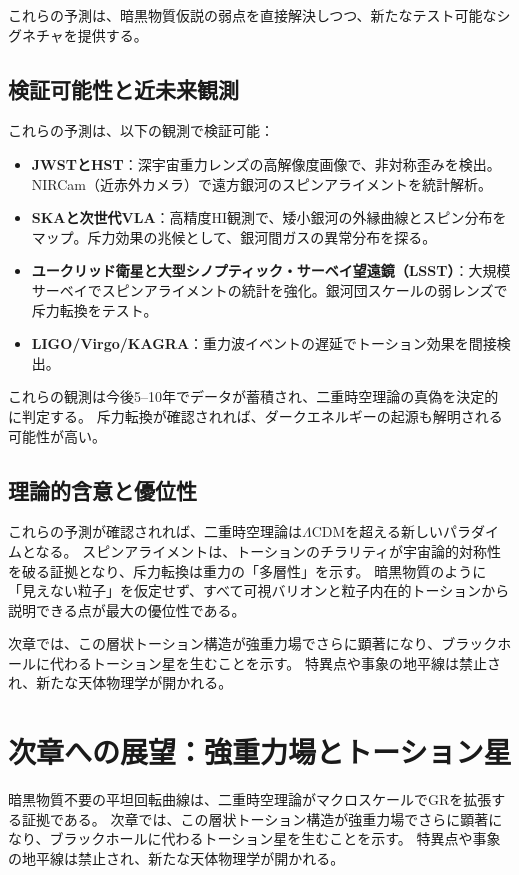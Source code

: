\documentclass[dvipdfmx,a4paper]{jsbook}
\theoremstyle{definition}
\theoremstyle{remark}
\begin{document}
これらの予測は、暗黒物質仮説の弱点を直接解決しつつ、新たなテスト可能なシグネチャを提供する。

\subsection{検証可能性と近未来観測}

これらの予測は、以下の観測で検証可能：
\begin{itemize}
  \item \textbf{JWSTとHST}：深宇宙重力レンズの高解像度画像で、非対称歪みを検出。NIRCam（近赤外カメラ）で遠方銀河のスピンアライメントを統計解析。
  \item \textbf{SKAと次世代VLA}：高精度HI観測で、矮小銀河の外縁曲線とスピン分布をマップ。斥力効果の兆候として、銀河間ガスの異常分布を探る。
  \item \textbf{ユークリッド衛星と大型シノプティック・サーベイ望遠鏡（LSST）}：大規模サーベイでスピンアライメントの統計を強化。銀河団スケールの弱レンズで斥力転換をテスト。
  \item \textbf{LIGO/Virgo/KAGRA}：重力波イベントの遅延でトーション効果を間接検出。
\end{itemize}

これらの観測は今後5--10年でデータが蓄積され、二重時空理論の真偽を決定的に判定する。  
斥力転換が確認されれば、ダークエネルギーの起源も解明される可能性が高い。

\subsection{理論的含意と優位性}

これらの予測が確認されれば、二重時空理論は$\Lambda$CDMを超える新しいパラダイムとなる。  
スピンアライメントは、トーションのチラリティが宇宙論的対称性を破る証拠となり、斥力転換は重力の「多層性」を示す。  
暗黒物質のように「見えない粒子」を仮定せず、すべて可視バリオンと粒子内在的トーションから説明できる点が最大の優位性である。

次章では、この層状トーション構造が強重力場でさらに顕著になり、ブラックホールに代わるトーション星を生むことを示す。  
特異点や事象の地平線は禁止され、新たな天体物理学が開かれる。

\section{次章への展望：強重力場とトーション星}
\label{sec:to-torsion-stars}

暗黒物質不要の平坦回転曲線は、二重時空理論がマクロスケールでGRを拡張する証拠である。  
次章では、この層状トーション構造が強重力場でさらに顕著になり、ブラックホールに代わるトーション星を生むことを示す。  
特異点や事象の地平線は禁止され、新たな天体物理学が開かれる。
\end{document}
